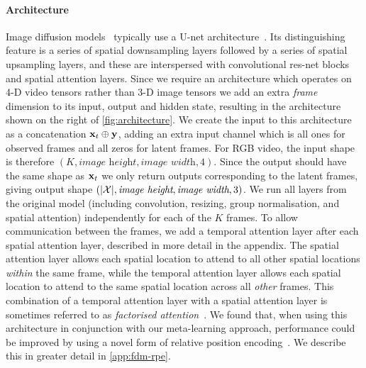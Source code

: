 \paragraph{Architecture}
\label{sec:fdm-architecture}
Image diffusion models~\citep{ho2020denoising,nichol2021improved} typically use a U-net architecture~\cite{ronneberger2015u}. Its distinguishing feature is a series of spatial downsampling layers followed by a series of spatial upsampling layers, and these are interspersed with convolutional res-net blocks~\cite{he2015deep} and spatial attention layers. Since we require an architecture which operates on 4-D video tensors rather than 3-D image tensors we add an extra \textit{frame} dimension to its input, output and hidden state, resulting in the architecture shown on the right of \cref{fig:architecture}. We create the input to this architecture as a concatenation ${\mathbf{x}}_t \oplus {\mathbf{y}}$, adding an extra input channel which is all ones for observed frames and all zeros for latent frames. For RGB video, the input shape is therefore $(K, \textit{image height}, \textit{image width}, 4)$. Since the output should have the same shape as ${\mathbf{x}}_t$ we only return outputs corresponding to the latent frames, giving output shape  $(|\mathcal{X}|, \textit{image height}, \textit{image width}, 3)$. We run all layers from the original model (including convolution, resizing, group normalisation, and spatial attention) independently for each of the $K$ frames.
To allow communication between the frames, we add a temporal attention layer after each spatial attention layer, described in more detail in the appendix. 
%
The spatial attention layer allows each spatial location to attend to all other spatial locations \textit{within} the same frame, while the temporal attention layer allows each spatial location to attend to the same spatial location across all \textit{other} frames.
%
This combination of a temporal attention layer with a spatial attention layer is sometimes referred to as \textit{factorised attention}~\citep{tashiro2021csdi,ho2022video}. We found that, when using this architecture in conjunction with our meta-learning approach, performance could be improved by using a novel form of relative position encoding~\cite{shaw2018self,wu2021rethinking}. We describe this in greater detail in \cref{app:fdm-rpe}.

